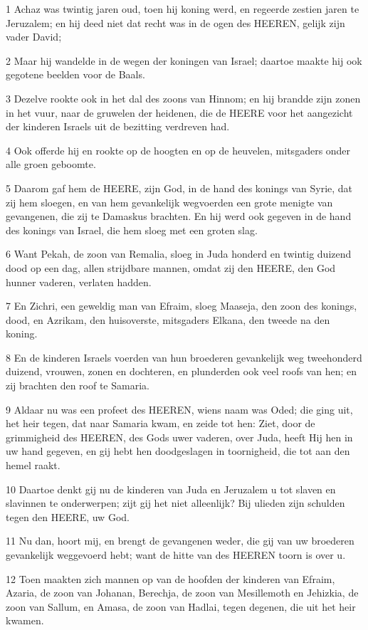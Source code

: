 \par 1 Achaz was twintig jaren oud, toen hij koning werd, en regeerde zestien jaren te Jeruzalem; en hij deed niet dat recht was in de ogen des HEEREN, gelijk zijn vader David;
\par 2 Maar hij wandelde in de wegen der koningen van Israel; daartoe maakte hij ook gegotene beelden voor de Baals.
\par 3 Dezelve rookte ook in het dal des zoons van Hinnom; en hij brandde zijn zonen in het vuur, naar de gruwelen der heidenen, die de HEERE voor het aangezicht der kinderen Israels uit de bezitting verdreven had.
\par 4 Ook offerde hij en rookte op de hoogten en op de heuvelen, mitsgaders onder alle groen geboomte.
\par 5 Daarom gaf hem de HEERE, zijn God, in de hand des konings van Syrie, dat zij hem sloegen, en van hem gevankelijk wegvoerden een grote menigte van gevangenen, die zij te Damaskus brachten. En hij werd ook gegeven in de hand des konings van Israel, die hem sloeg met een groten slag.
\par 6 Want Pekah, de zoon van Remalia, sloeg in Juda honderd en twintig duizend dood op een dag, allen strijdbare mannen, omdat zij den HEERE, den God hunner vaderen, verlaten hadden.
\par 7 En Zichri, een geweldig man van Efraim, sloeg Maaseja, den zoon des konings, dood, en Azrikam, den huisoverste, mitsgaders Elkana, den tweede na den koning.
\par 8 En de kinderen Israels voerden van hun broederen gevankelijk weg tweehonderd duizend, vrouwen, zonen en dochteren, en plunderden ook veel roofs van hen; en zij brachten den roof te Samaria.
\par 9 Aldaar nu was een profeet des HEEREN, wiens naam was Oded; die ging uit, het heir tegen, dat naar Samaria kwam, en zeide tot hen: Ziet, door de grimmigheid des HEEREN, des Gods uwer vaderen, over Juda, heeft Hij hen in uw hand gegeven, en gij hebt hen doodgeslagen in toornigheid, die tot aan den hemel raakt.
\par 10 Daartoe denkt gij nu de kinderen van Juda en Jeruzalem u tot slaven en slavinnen te onderwerpen; zijt gij het niet alleenlijk? Bij ulieden zijn schulden tegen den HEERE, uw God.
\par 11 Nu dan, hoort mij, en brengt de gevangenen weder, die gij van uw broederen gevankelijk weggevoerd hebt; want de hitte van des HEEREN toorn is over u.
\par 12 Toen maakten zich mannen op van de hoofden der kinderen van Efraim, Azaria, de zoon van Johanan, Berechja, de zoon van Mesillemoth en Jehizkia, de zoon van Sallum, en Amasa, de zoon van Hadlai, tegen degenen, die uit het heir kwamen.

